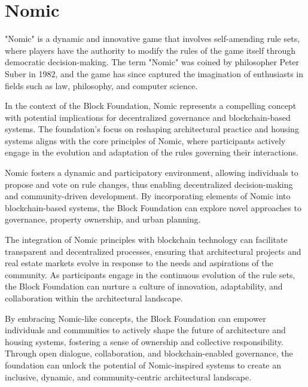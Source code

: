 \section{Nomic}


"Nomic" is a dynamic and innovative game that involves self-amending rule sets, where players have the authority to modify the rules of the game itself through democratic decision-making. The term "Nomic" was coined by philosopher Peter Suber in 1982, and the game has since captured the imagination of enthusiasts in fields such as law, philosophy, and computer science.

In the context of the Block Foundation, Nomic represents a compelling concept with potential implications for decentralized governance and blockchain-based systems. The foundation's focus on reshaping architectural practice and housing systems aligns with the core principles of Nomic, where participants actively engage in the evolution and adaptation of the rules governing their interactions.

Nomic fosters a dynamic and participatory environment, allowing individuals to propose and vote on rule changes, thus enabling decentralized decision-making and community-driven development. By incorporating elements of Nomic into blockchain-based systems, the Block Foundation can explore novel approaches to governance, property ownership, and urban planning.

The integration of Nomic principles with blockchain technology can facilitate transparent and decentralized processes, ensuring that architectural projects and real estate markets evolve in response to the needs and aspirations of the community. As participants engage in the continuous evolution of the rule sets, the Block Foundation can nurture a culture of innovation, adaptability, and collaboration within the architectural landscape.

By embracing Nomic-like concepts, the Block Foundation can empower individuals and communities to actively shape the future of architecture and housing systems, fostering a sense of ownership and collective responsibility. Through open dialogue, collaboration, and blockchain-enabled governance, the foundation can unlock the potential of Nomic-inspired systems to create an inclusive, dynamic, and community-centric architectural landscape.